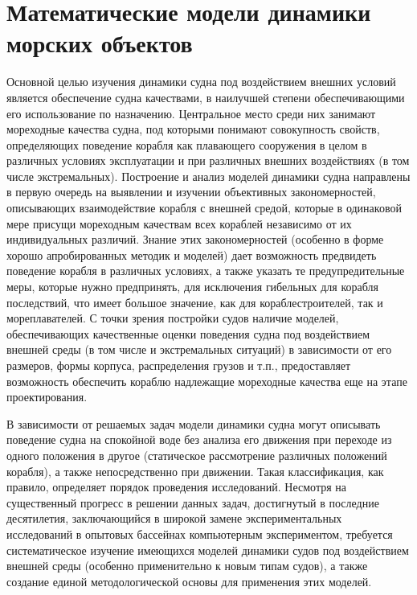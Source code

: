\section{Математические модели динамики \mbox{морских} объектов}



Основной целью изучения динамики судна под воздействием внешних условий является обеспечение судна качествами, в наилучшей степени обеспечивающими его использование по назначению. Центральное место среди них занимают мореходные качества судна, под которыми понимают совокупность свойств, определяющих поведение корабля как плавающего сооружения в целом в различных условиях эксплуатации и при различных внешних воздействиях (в том числе экстремальных). Построение и анализ моделей динамики судна направлены в первую очередь на выявлении и изучении объективных закономерностей, описывающих взаимодействие корабля с внешней средой, которые в одинаковой мере присущи мореходным качествам всех кораблей независимо от их индивидуальных различий. Знание этих закономерностей (особенно в форме хорошо апробированных методик и моделей) дает возможность предвидеть поведение корабля в различных условиях, а также указать те предупредительные меры, которые нужно предпринять, для исключения гибельных для корабля последствий, что имеет большое значение, как для кораблестроителей, так и мореплавателей. С точки зрения постройки судов наличие моделей, обеспечивающих качественные оценки поведения судна под воздействием внешней среды (в том числе и экстремальных ситуаций) в зависимости от его размеров, формы корпуса, распределения грузов и т.п., предоставляет возможность обеспечить кораблю надлежащие мореходные качества еще  на этапе проектирования.

В зависимости от решаемых задач модели динамики судна могут описывать поведение судна на спокойной воде без анализа его движения при переходе из одного положения в другое (статическое рассмотрение различных положений корабля), а также непосредственно при движении. Такая классификация, как правило, определяет порядок проведения исследований. Несмотря на существенный прогресс в решении данных задач, достигнутый в последние десятилетия, заключающийся в широкой замене экспериментальных исследований в опытовых бассейнах компьютерным экспериментом, требуется систематическое изучение имеющихся моделей динамики судов под воздействием внешней среды (особенно применительно к новым типам судов), а также создание единой методологической основы для применения этих моделей.

